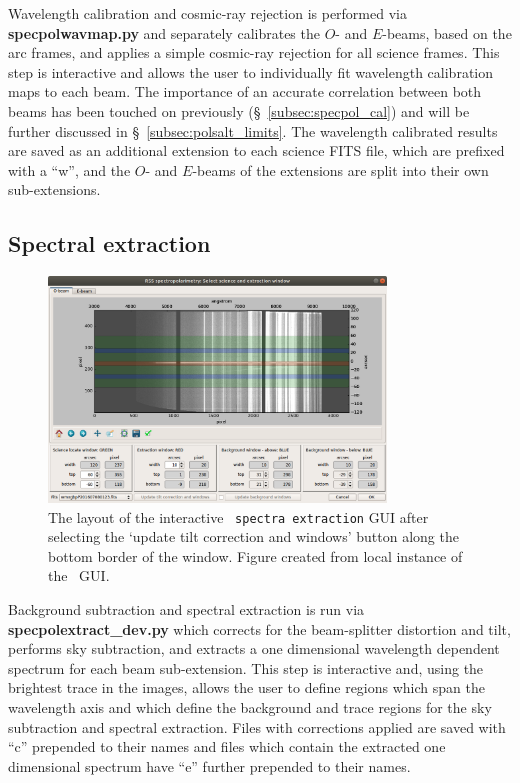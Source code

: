 Wavelength calibration and cosmic-ray rejection is performed via \textbf{specpolwavmap.py} and separately calibrates the $O$- and $E$-beams, based on the arc frames, and applies a simple cosmic-ray rejection for all science frames. This step is interactive and allows the user to individually fit wavelength calibration maps to each beam. The importance of an accurate correlation between both beams has been touched on previously (\S~\ref{subsec:specpol_cal}) and will be further discussed in \S~\ref{subsec:polsalt_limits}. The wavelength calibrated results are saved as an additional extension to each science FITS file, which are prefixed with a ``w'', and the $O$- and $E$-beams of the extensions are split into their own sub-extensions.

\subsection{Spectral extraction}

\begin{figure}[t]
    \centering
    \includegraphics[width = 0.8\textwidth]{figures/3_polsalt_tilt.png}
    \caption{The layout of the interactive \polsalt\ \texttt{spectra extraction} \gls{GUI} after selecting the `update tilt correction and windows' button along the bottom border of the window. Figure created from local instance of the \polsalt\ \gls{GUI}.}
    \label{fig:polsalt_gui_spec}
\end{figure}

Background subtraction and spectral extraction is run via \textbf{spec\-pol\-extract\_dev.py} which corrects for the beam-splitter distortion and tilt, performs sky subtraction, and extracts a one dimensional wavelength dependent spectrum for each beam sub-extension. This step is interactive and, using the brightest trace in the images, allows the user to define regions which span the wavelength axis and which define the background and trace regions for the sky subtraction and spectral extraction. Files with corrections applied are saved with ``c'' prepended to their names and files which contain the extracted one dimensional spectrum have ``e'' further prepended to their names.

